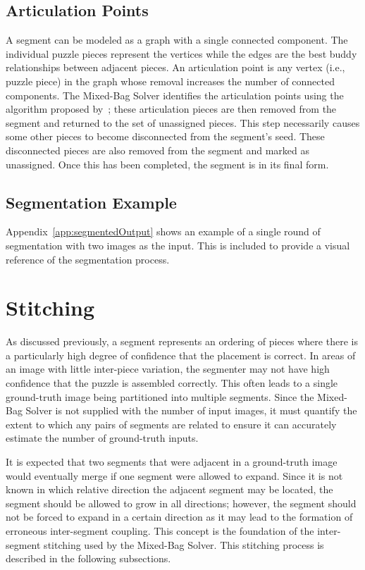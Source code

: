 \subsection{Articulation Points}\label{sec:articulationPoints}

A segment can be modeled as a graph with a single connected component.  The individual puzzle pieces represent the vertices while the edges are the best buddy relationships between adjacent pieces.  An articulation point is any vertex (i.e., puzzle piece) in the graph whose removal increases the number of connected components.  The Mixed-Bag Solver identifies the articulation points using the algorithm proposed by~\cite{cormenIntroToAlgorithms}; these articulation pieces are then removed from the segment and returned to the set of unassigned pieces.  This step necessarily causes some other pieces to become disconnected from the segment's seed.  These disconnected pieces are also removed from the segment and marked as unassigned. Once this has been completed, the segment is in its final form.

\subsection{Segmentation Example}

Appendix~\ref{app:segmentedOutput} shows an example of a single round of segmentation with two images as the input. This is included to provide a visual reference of the segmentation process.

\section{Stitching}\label{sec:stitching}

As discussed previously, a segment represents an ordering of pieces where there is a particularly high degree of confidence that the placement is correct.  In areas of an image with little inter-piece variation, the segmenter may not have high confidence that the puzzle is assembled correctly.  This often leads to a single ground-truth image being partitioned into multiple segments. Since the Mixed-Bag Solver is not supplied with the number of input images, it must quantify the extent to which any pairs of segments are related to ensure it can accurately estimate the number of ground-truth inputs.  

It is expected that two segments that were adjacent in a ground-truth image would eventually merge if one segment were allowed to expand. Since it is not known in which relative direction the adjacent segment may be located, the segment should be allowed to grow in all directions; however, the segment should not be forced to expand in a certain direction as it may lead to the formation of erroneous inter-segment coupling.  This concept is the foundation of the inter-segment stitching used by the Mixed-Bag Solver.  This stitching process is described in the following subsections.


